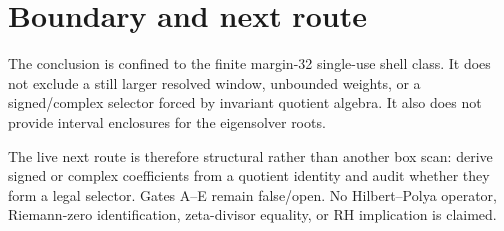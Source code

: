 \documentclass[11pt]{article}
\theoremstyle{remark}
\begin{document}
\section{Boundary and next route}

The conclusion is confined to the finite margin-32 single-use shell class.
It does not exclude a still larger resolved window, unbounded weights, or a
signed/complex selector forced by invariant quotient algebra.  It also does
not provide interval enclosures for the eigensolver roots.

The live next route is therefore structural rather than another box scan:
derive signed or complex coefficients from a quotient identity and audit
whether they form a legal selector.  Gates A--E remain false/open.  No
Hilbert--Polya operator, Riemann-zero identification, zeta-divisor equality,
or RH implication is claimed.



\end{document}
